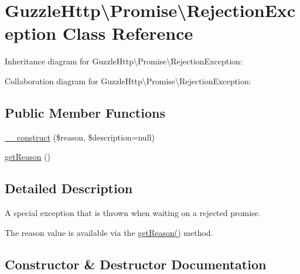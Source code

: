 \hypertarget{classGuzzleHttp_1_1Promise_1_1RejectionException}{}\section{Guzzle\+Http\textbackslash{}Promise\textbackslash{}Rejection\+Exception Class Reference}
\label{classGuzzleHttp_1_1Promise_1_1RejectionException}


Inheritance diagram for Guzzle\+Http\textbackslash{}Promise\textbackslash{}Rejection\+Exception\+:


Collaboration diagram for Guzzle\+Http\textbackslash{}Promise\textbackslash{}Rejection\+Exception\+:
\subsection*{Public Member Functions}
\begin{DoxyCompactItemize}
\item 
\hyperlink{classGuzzleHttp_1_1Promise_1_1RejectionException_abd260fba21cc50be0bac1c6a72dcfcdc}{\+\_\+\+\_\+construct} (\$reason, \$description=null)
\item 
\hyperlink{classGuzzleHttp_1_1Promise_1_1RejectionException_adf1084b13006599a6af3dfc90ad28543}{get\+Reason} ()
\end{DoxyCompactItemize}


\subsection{Detailed Description}
A special exception that is thrown when waiting on a rejected promise.

The reason value is available via the \hyperlink{classGuzzleHttp_1_1Promise_1_1RejectionException_adf1084b13006599a6af3dfc90ad28543}{get\+Reason()} method. 

\subsection{Constructor \& Destructor Documentation}
\mbox{\label{classGuzzleHttp_1_1Promise_1_1RejectionException_abd260fba21cc50be0bac1c6a72dcfcdc}} 

